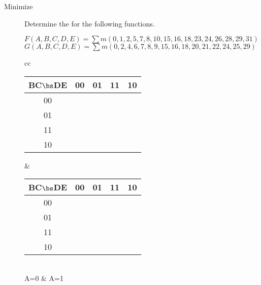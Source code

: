 \begin{description}
\pagebreak

\item[Minimize]  Determine the \SOPmin  for the following functions.

\begin{description}
\item[$F(A,B,C,D,E) = \sum m(0,1,2,5,7,8,10,15,16,18,23,24,26,28,29,31)$]
\item[$G(A,B,C,D,E) = \sum m(0,2,4,6,7,8,9,15,16,18,20,21,22,24,25,29)$]
\end{description}

    \begin{tabular}{cc}
	    \begin{tabular} {c||c|c|c|c}
	       BC$\bs$DE & 00 & 01 & 11 & 10 \\ \hline \hline
	       00        &    &    &    &    \\ \hline
	       01        &    &    &    &    \\ \hline
	       11        &    &    &    &    \\ \hline
	       10        &    &    &    &    \\
	    \end{tabular}		&
	    \begin{tabular} {c||c|c|c|c}
	       BC$\bs$DE & 00 & 01 & 11 & 10 \\ \hline \hline
	       00        &    &    &    &    \\ \hline
	       01        &    &    &    &    \\ \hline
	       11        &    &    &    &    \\ \hline
	       10        &    &    &    &    \\
	    \end{tabular}		\\
	A=0 & A=1 			\\ 
		 \vspace{0.2in} \\ 


\end{tabular}
\end{description}
